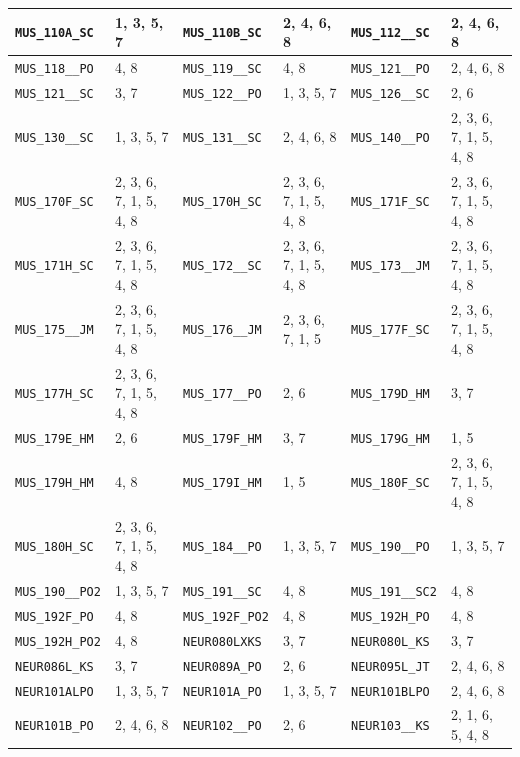 \begin{longtable}{|l|l||l|l||l|l|}
    \verb|MUS_110A_SC| & 1, 3, 5, 7 & \verb|MUS_110B_SC| & 2, 4, 6, 8 & \verb|MUS_112__SC| & 2, 4, 6, 8\\\hline
    \verb|MUS_118__PO| & 4, 8 & \verb|MUS_119__SC| & 4, 8 & \verb|MUS_121__PO| & 2, 4, 6, 8\\\hline
    \verb|MUS_121__SC| & 3, 7 & \verb|MUS_122__PO| & 1, 3, 5, 7 & \verb|MUS_126__SC| & 2, 6\\\hline
    \verb|MUS_130__SC| & 1, 3, 5, 7 & \verb|MUS_131__SC| & 2, 4, 6, 8 & \verb|MUS_140__PO| & 2, 3, 6, 7, 1, 5, 4, 8\\\hline
    \verb|MUS_170F_SC| & 2, 3, 6, 7, 1, 5, 4, 8 & \verb|MUS_170H_SC| & 2, 3, 6, 7, 1, 5, 4, 8 & \verb|MUS_171F_SC| & 2, 3, 6, 7, 1, 5, 4, 8\\\hline
    \verb|MUS_171H_SC| & 2, 3, 6, 7, 1, 5, 4, 8 & \verb|MUS_172__SC| & 2, 3, 6, 7, 1, 5, 4, 8 & \verb|MUS_173__JM| & 2, 3, 6, 7, 1, 5, 4, 8\\\hline
    \verb|MUS_175__JM| & 2, 3, 6, 7, 1, 5, 4, 8 & \verb|MUS_176__JM| & 2, 3, 6, 7, 1, 5 & \verb|MUS_177F_SC| & 2, 3, 6, 7, 1, 5, 4, 8\\\hline
    \verb|MUS_177H_SC| & 2, 3, 6, 7, 1, 5, 4, 8 & \verb|MUS_177__PO| & 2, 6 & \verb|MUS_179D_HM| & 3, 7\\\hline
    \verb|MUS_179E_HM| & 2, 6 & \verb|MUS_179F_HM| & 3, 7 & \verb|MUS_179G_HM| & 1, 5\\\hline
    \verb|MUS_179H_HM| & 4, 8 & \verb|MUS_179I_HM| & 1, 5 & \verb|MUS_180F_SC| & 2, 3, 6, 7, 1, 5, 4, 8\\\hline
    \verb|MUS_180H_SC| & 2, 3, 6, 7, 1, 5, 4, 8 & \verb|MUS_184__PO| & 1, 3, 5, 7 & \verb|MUS_190__PO| & 1, 3, 5, 7\\\hline
    \verb|MUS_190__PO2| & 1, 3, 5, 7 & \verb|MUS_191__SC| & 4, 8 & \verb|MUS_191__SC2| & 4, 8\\\hline
    \verb|MUS_192F_PO| & 4, 8 & \verb|MUS_192F_PO2| & 4, 8 & \verb|MUS_192H_PO| & 4, 8\\\hline
    \verb|MUS_192H_PO2| & 4, 8 & \verb|NEUR080LXKS| & 3, 7 & \verb|NEUR080L_KS| & 3, 7\\\hline
    \verb|NEUR086L_KS| & 3, 7 & \verb|NEUR089A_PO| & 2, 6 & \verb|NEUR095L_JT| & 2, 4, 6, 8\\\hline
    \verb|NEUR101ALPO| & 1, 3, 5, 7 & \verb|NEUR101A_PO| & 1, 3, 5, 7 & \verb|NEUR101BLPO| & 2, 4, 6, 8\\\hline
    \verb|NEUR101B_PO| & 2, 4, 6, 8 & \verb|NEUR102__PO| & 2, 6 & \verb|NEUR103__KS| & 2, 1, 6, 5, 4, 8\\\hline

\end{longtable}
